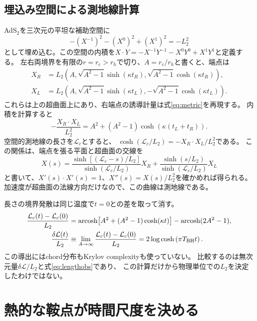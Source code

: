 \documentclass[a4paper,11pt]{ltjsarticle}
\numberwithin{equation}{section}
\begin{document}
\subsection{埋込み空間による測地線計算}
AdS$_2$を三次元の平坦な補助空間に
\begin{equation}
 -(X^{-1})^2-(X^0)^2+(X^1)^2=-L_2^2
\end{equation}
として埋め込む。この空間の内積を$X\cdot Y=-X^{-1}Y^{-1}-X^0Y^0+X^1Y^1$と定義する。
左右両境界を有限の$r=r_c>r_h$で切り、$A=r_c/r_h$と書くと、端点は
\begin{align}
 X_R&=L_2\left(A,\sqrt{A^2-1}\sinh(\kappa t_R),
                  \sqrt{A^2-1}\cosh(\kappa t_R)\right),\\
 X_L&=L_2\left(A,\sqrt{A^2-1}\sinh(\kappa t_L),
                 -\sqrt{A^2-1}\cosh(\kappa t_L)\right).
\end{align}
これらは上の超曲面上にあり、右端点の誘導計量は式\eqref{eq:metric}を再現する。
内積を計算すると
\begin{equation}
 -\frac{X_R\cdot X_L}{L_2^2}
 =A^2+(A^2-1)\cosh\!\left(\kappa(t_L+t_R)\right).
 \label{eq:invariant}
\end{equation}
空間的測地線の長さを$\mathcal L_c$とすると、
$\cosh(\mathcal L_c/L_2)=-X_R\cdot X_L/L_2^2$である。
この関係は、端点を張る平面と超曲面の交線を
\begin{equation}
 X(s)=\frac{\sinh[(\mathcal L_c-s)/L_2]}{\sinh(\mathcal L_c/L_2)}X_R
 +\frac{\sinh(s/L_2)}{\sinh(\mathcal L_c/L_2)}X_L
\end{equation}
と書いて、$X'(s)\cdot X'(s)=1$、$X''(s)=X(s)/L_2^2$を確かめれば得られる。
加速度が超曲面の法線方向だけなので、この曲線は測地線である。

長さの境界発散は同じ温度で$t=0$との差を取って消す。
\begin{align}
 \frac{\mathcal L_c(t)-\mathcal L_c(0)}{L_2}
 &=\operatorname{arcosh}\!\left[A^2+(A^2-1)\cosh(\kappa t)\right]
   -\operatorname{arcosh}(2A^2-1),\\
 \frac{\delta\mathcal L(t)}{L_2}
 &\equiv\lim_{A\to\infty}\frac{\mathcal L_c(t)-\mathcal L_c(0)}{L_2}
 =2\log\cosh\left(\pi T_{\rm BH}t\right).
 \label{eq:geo}
\end{align}
この導出にはchord分布もKrylov complexityも使っていない。
比較するのは無次元量$\delta\mathcal L/L_2$と式\eqref{eq:lengthobs}であり、
この計算だけから物理単位での$L_2$を決定したわけではない。

\section{熱的な鞍点が時間尺度を決める}
\end{document}
